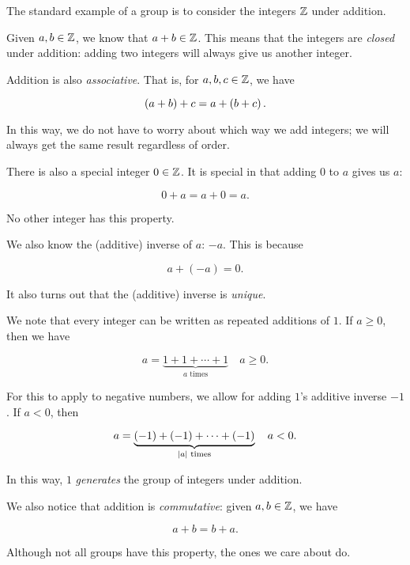 \begin{example}
The standard example of a \gls{group} is to consider the
integers $\mathbb{Z}$ under addition.

Given $a,b\in\mathbb{Z}$, we know that $a+b\in\mathbb{Z}$.
This means that the integers are \emph{closed} under addition:
adding two integers will always give us another integer.

Addition is also \emph{\gls{associative}}.
That is, for $a,b,c\in\mathbb{Z}$, we have

\begin{equation}
    \left( a + b \right) + c = a + \left( b + c \right).
\end{equation}

\noindent
In this way, we do not have to worry about which way we add integers;
we will always get the same result regardless of order.

There is also a special integer $0\in\mathbb{Z}$.
It is special in that adding $0$ to $a$ gives us $a$:

\begin{equation}
    0 + a = a + 0 = a.
\end{equation}

\noindent
No other integer has this property.

We also know the (additive) inverse of $a$: $-a$.
This is because

\begin{equation}
    a + (-a) = 0.
\end{equation}

\noindent
It also turns out that the (additive) inverse is \emph{unique}.

We note that every integer can be written as
repeated additions of $1$.
If $a\ge0$, then we have

\begin{equation}
    a = \underbrace{1 + 1 + \cdots + 1}_{\text{$a$ times}} \quad a\ge 0.
    \label{eq:math_groups_integers_1_gen_pos}
\end{equation}

\noindent
For this to apply to negative numbers, we allow for adding $1$'s
additive inverse $-1$.
If $a<0$, then

\begin{equation}
    a = \underbrace{(-1) + (-1) + \cdots + (-1)}_{\text{$\left| a \right|$ times}}
        \quad a < 0.
    \label{eq:math_groups_integers_1_gen_neg}
\end{equation}

\noindent
In this way, $1$ \emph{generates} the \gls{group} of integers under addition.

We also notice that addition is \emph{\gls{commutative}}:
given $a,b\in\mathbb{Z}$, we have

\begin{equation}
    a + b = b + a.
\end{equation}

\noindent
Although not all \glspl{group} have this property, the ones we care about do.
\end{example}

